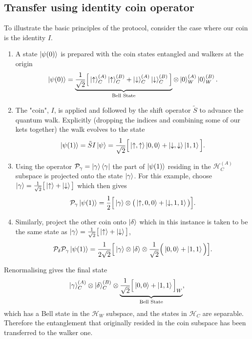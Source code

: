 \subsection{Transfer using identity coin operator}
\label{subsection:qw_transfer}
To illustrate the basic principles of the protocol, consider the case where our coin is the identity $I$.
\begin{enumerate}
    \item A state $\ket{\psi(0)}$ is prepared with the coin states entangled and walkers at the origin
    \begin{equation}
        \ket{\psi(0)} = \underbrace{\frac{1}{\sqrt{2}}\Big [\ket{\uparrow}^{(A)}_C\ket{\uparrow}^{(B)}_C + \ket{\downarrow}^{(A)}_C\ket{\downarrow}^{(B)}_C \Big]}_{\text{Bell State}}\otimes \ket{0}^{(A)}_W\ket{0}^{(B)}_W.
    \end{equation}
    \item The "coin", $I$, is applied and followed by the shift operator $\tilde{S}$ to advance the quantum walk.
    Explicitly (dropping the indices and combining some of our kets together) the walk evolves to the state
    \begin{equation}
        \ket{\psi(1)} = \tilde{S}I\ket{\psi} = \frac{1}{\sqrt{2}}\Big [\ket{\uparrow,\uparrow}\ket{0,0} + \ket{\downarrow,\downarrow}\ket{1,1}\Big].
    \end{equation}
    \item Using the operator $\mathcal{P}_{\gamma} = \ket{\gamma}\bra{\gamma}$ the part of $\ket{\psi(1)}$ residing in the $\mathcal{H}^{(A)}_C$ subspace is projected onto the state $\ket{\gamma}$. \newline
    For this example, choose $\ket{\gamma} = \frac{1}{\sqrt{2}} \big [\ket{\uparrow} + \ket{\downarrow} \big]$ which then gives
    \begin{equation}
        \mathcal{P}_\gamma \ket{\psi(1)} = \frac{1}{2}\Big [\ket{\gamma}\otimes \big (\ket{\uparrow, 0, 0} + \ket{\downarrow, 1, 1}\big )\Big ].
    \end{equation}
    \item Similarly, project the other coin onto $\ket{\delta}$ which in this instance is taken to be the same state as $\ket{\gamma} = \frac{1}{\sqrt{2}} \big [\ket{\uparrow} + \ket{\downarrow} \big]$,
    \begin{equation}
        \mathcal{P}_\delta \mathcal{P}_\gamma \ket{\psi(1)} = \frac{1}{2\sqrt{2}}\Big [\ket{\gamma}\otimes \ket{\delta} \otimes \frac{1}{\sqrt{2}}\Big (\ket{0, 0} + \ket{1, 1}\Big )\Big ].
    \end{equation}
\end{enumerate}
Renormalising gives the final state
\begin{equation}
    \label{equation:qw_transfer_1_final}
    \ket{\gamma}^{(A)}_C \otimes \ket{\delta}^{(B)}_C \otimes \underbrace{\frac{1}{\sqrt{2}}\Big [\ket{0, 0} + \ket{1, 1}\Big ]_W}_{\text{Bell State}},
\end{equation}
which has a Bell state in the $\mathcal{H}_W$ subspace, and the states in $\mathcal{H}_C$ are separable.
Therefore the entanglement that originally resided in the coin subspace has been transferred to the walker one.


